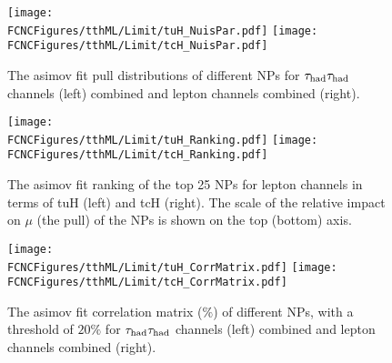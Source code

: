 \begin{figure}[htb]
\centering
\texttt{[image: \\FCNCFigures/tthML/Limit/tuH\_NuisPar.pdf]}
\texttt{[image: \\FCNCFigures/tthML/Limit/tcH\_NuisPar.pdf]}
\caption{ The asimov fit pull distributions of different NPs for $\tau_\text{had}{}\tau_\text{had}$ channels (left) combined and lepton channels combined (right). }
\label{fig:fcnc_pull_sb_data}
\end{figure}

\begin{figure}[htb]
\centering
\texttt{[image: \\FCNCFigures/tthML/Limit/tuH\_Ranking.pdf]}
\texttt{[image: \\FCNCFigures/tthML/Limit/tcH\_Ranking.pdf]}
\caption{ The asimov fit ranking of the top 25 NPs for lepton channels in terms of tuH (left) and tcH (right). The scale of the relative impact on $\mu$ (the pull) of the NPs is shown on the top (bottom) axis.}
\label{fig:fcnc_rank_data}
\end{figure}

\begin{figure}[htb]
\centering
\texttt{[image: \\FCNCFigures/tthML/Limit/tuH\_CorrMatrix.pdf]}
\texttt{[image: \\FCNCFigures/tthML/Limit/tcH\_CorrMatrix.pdf]}
\caption{ The asimov fit correlation matrix ($\%$) of different NPs, with a threshold of $20\%$ for $\tau_\text{had}{}\tau_\text{had}$ channels (left) combined and lepton channels combined (right). }
\label{fig:fcnc_correl_data}
\end{figure}
